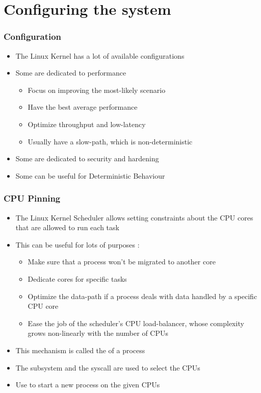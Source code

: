 \section{Configuring the system}

\begin{frame}
	\frametitle{Configuration}
	\begin{itemize}
		\item The Linux Kernel has a lot of available configurations
		\item Some are dedicated to performance
			\begin{itemize}
				\item Focus on improving the most-likely scenario
				\item Have the best average performance
				\item Optimize throughput and low-latency
				\item Usually have a slow-path, which is non-deterministic
			\end{itemize}
		\item Some are dedicated to security and hardening
		\item Some can be useful for Deterministic Behaviour
	\end{itemize}
\end{frame}

\begin{frame}
	\frametitle{CPU Pinning}
	\begin{itemize}
		\item The Linux Kernel Scheduler allows setting constraints about the CPU cores that are allowed
			to run each task
		\item This can be useful for lots of purposes :
			\begin{itemize}
				\item Make sure that a process won't be migrated to another core
				\item Dedicate cores for specific tasks
				\item Optimize the data-path if a process deals with data handled by a specific CPU core
				\item Ease the job of the scheduler's CPU load-balancer, whose complexity grows non-linearly with the number of CPUs
			\end{itemize}
		\item This mechanism is called the  of a process
		\item The  subsystem and the  syscall are used to select the CPUs
		\item Use  to start a new process on the given CPUs
	\end{itemize}
\end{frame}

